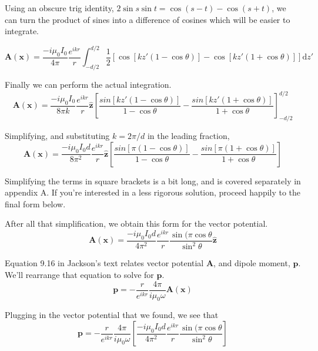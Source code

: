 \documentclass[10pt,a4paper]{article}
\begin{document}
Using an obscure trig identity, $2 \sin s \sin t = \cos(s-t) - \cos(s+t)$, we can turn the product of sines into a difference of cosines which will be easier to integrate.

\begin{equation}
\mathbf{A}(\mathbf{x})=\frac{-i\mu_0 I_0}{4\pi}\frac{e^{ikr}}{r}\int_{-d/2}^{d/2}\frac{1}{2}\left[
\cos[kz'(1-\cos\theta)]-\cos[kz'(1+\cos\theta)]
\right] \mathrm{d}z'
\end{equation}

Finally we can perform the actual integration.
\begin{equation}
\mathbf{A}(\mathbf{x})=\frac{-i\mu_0 I_0}{8\pi k}\frac{e^{ikr}}{r}\hat{\mathbf{z}}\left[
\frac{sin[kz'(1-\cos\theta)]}{1-\cos\theta}-\frac{sin[kz'(1+\cos\theta)]}{1+\cos\theta}
\right]_{-d/2}^{d/2}
\end{equation}

Simplifying, and substituting $k=2\pi/d$ in the leading fraction,
\begin{equation}
\mathbf{A}(\mathbf{x})=\frac{-i\mu_0 I_0 d}{8 \pi^2}\frac{e^{ikr}}{r}\hat{\mathbf{z}}\left[
\frac{sin[\pi(1-\cos\theta)]}{1-\cos\theta}-\frac{sin[\pi(1+\cos\theta)]}{1+\cos\theta}
\right]
\end{equation}

Simplifying the terms in square brackets is a bit long, and is covered separately in appendix A. If you're interested in a less rigorous solution, proceed happily to the final form below.

After all that simplification, we obtain this form for the vector potential.
\begin{equation}
\mathbf{A}(\mathbf{x})=\frac{-i\mu_0 I_0 d}{4 \pi^2}\frac{e^{ikr}}{r}\frac{\sin(\pi\cos\theta}{\sin^2\theta}\hat{\mathbf{z}}
\end{equation}

Equation 9.16 in Jackson's text relates vector potential $\mathbf{A}$, and dipole moment, $\mathbf{p}$. We'll rearrange that equation to solve for $\mathbf{p}$.
\begin{equation}
\mathbf{p}=-\frac{r}{e^{ikr}}\frac{4\pi}{i\mu_0\omega}\mathbf{A}(\mathbf{x})
\end{equation}

Plugging in the vector potential that we found, we see that
\begin{equation}
\mathbf{p}=-\frac{r}{e^{ikr}}\frac{4\pi}{i\mu_0\omega}\left[\frac{-i\mu_0 I_0 d}{4 \pi^2}\frac{e^{ikr}}{r}\frac{\sin(\pi\cos\theta}{\sin^2\theta}\right]
\end{equation}
\end{document}
